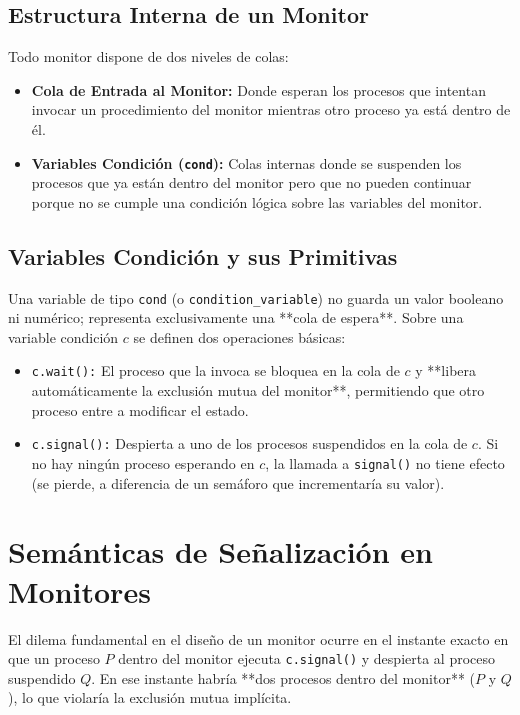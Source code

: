 \subsection{Estructura Interna de un Monitor}
Todo monitor dispone de dos niveles de colas:
\begin{itemize}
    \item \textbf{Cola de Entrada al Monitor:} Donde esperan los procesos que intentan invocar un procedimiento del monitor mientras otro proceso ya está dentro de él.
    \item \textbf{Variables Condición (\texttt{cond}):} Colas internas donde se suspenden los procesos que ya están dentro del monitor pero que no pueden continuar porque no se cumple una condición lógica sobre las variables del monitor.
\end{itemize}

\subsection{Variables Condición y sus Primitivas}
Una variable de tipo \texttt{cond} (o \texttt{condition\_variable}) no guarda un valor booleano ni numérico; representa exclusivamente una **cola de espera**.
Sobre una variable condición $c$ se definen dos operaciones básicas:
\begin{itemize}
    \item \texttt{c.wait():} El proceso que la invoca se bloquea en la cola de $c$ y **libera automáticamente la exclusión mutua del monitor**, permitiendo que otro proceso entre a modificar el estado.
    \item \texttt{c.signal():} Despierta a uno de los procesos suspendidos en la cola de $c$. Si no hay ningún proceso esperando en $c$, la llamada a \texttt{signal()} no tiene efecto (se pierde, a diferencia de un semáforo que incrementaría su valor).
\end{itemize}

\section{Semánticas de Señalización en Monitores}

El dilema fundamental en el diseño de un monitor ocurre en el instante exacto en que un proceso $P$ dentro del monitor ejecuta \texttt{c.signal()} y despierta al proceso suspendido $Q$. En ese instante habría **dos procesos dentro del monitor** ($P$ y $Q$), lo que violaría la exclusión mutua implícita.

